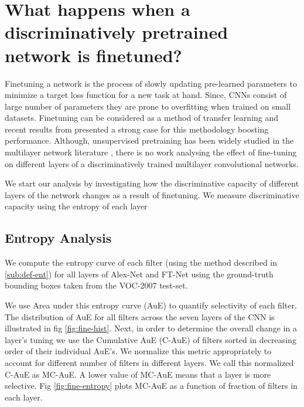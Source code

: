 \documentclass[runningheads]{llncs}
\begin{document}
\section{What happens when a discriminatively pretrained network is finetuned?}
\label{sec:fine}
Finetuning a network is the process of slowly updating pre-learned parameters to minimize a target loss function for a new task at hand. Since, CNNs consist of large number of parameters they are prone to overfitting when trained on small datasets. Finetuning can be considered as a method of transfer learning and recent results from \cite{Rcnn, Decaf} presented a strong case for this methodology boosting performance. Although, unsupervised pretraining has been widely studied in the multilayer network literature \cite{AmitGeman, DeepPre}, there is no work analysing the effect of fine-tuning on different layers of a discriminatively trained multilayer convolutional networks.

We start our analysis by investigating how the discriminative capacity of different layers of the network changes as a result of finetuning. We measure discriminative capacity using the entropy of each layer  

\subsection{Entropy Analysis}
\label{sub:fine-entropy}
We compute the entropy  curve of each filter (using the method described in \ref{sub:def-ent}) for all layers of Alex-Net and FT-Net using the ground-truth bounding boxes taken from the VOC-2007 test-set. 

We use Area under this entropy curve (AuE) to quantify selectivity of each filter. The distribution of AuE for all filters across the seven layers of the CNN is illustrated in fig \ref{fig:fine-hist}. Next, in order to determine the overall change in a layer's tuning we use the Cumulative AuE (C-AuE) of filters sorted in decreasing order of their individual AuE's. We normalize this metric appropriately to account for different number of filters in different layers. We call this normalized C-AuE as MC-AuE. A lower value of MC-AuE means that a layer is more selective.  Fig \ref{fig:fine-entropy} plots MC-AuE as a function of fraction of filters in each layer. 
\end{document}
